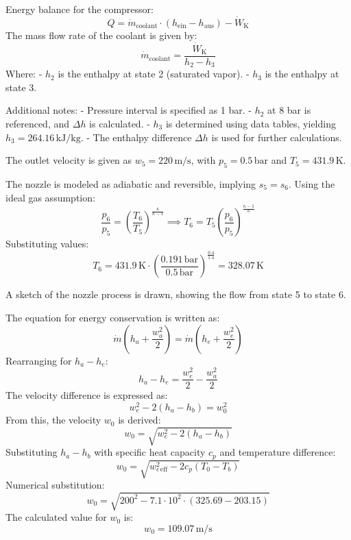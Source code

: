 Energy balance for the compressor:  
\[
Q = \dot{m}_{\text{coolant}} \cdot (h_{\text{ein}} - h_{\text{aus}}) - \dot{W}_{\text{K}}
\]  
The mass flow rate of the coolant is given by:  
\[
\dot{m}_{\text{coolant}} = \frac{\dot{W}_{\text{K}}}{h_2 - h_3}
\]  
Where:  
- \( h_2 \) is the enthalpy at state 2 (saturated vapor).  
- \( h_3 \) is the enthalpy at state 3.  

Additional notes:  
- Pressure interval is specified as 1 bar.  
- \( h_2 \) at 8 bar is referenced, and \( \Delta h \) is calculated.  
- \( h_3 \) is determined using data tables, yielding \( h_3 = 264.16 \, \text{kJ/kg} \).  
- The enthalpy difference \( \Delta h \) is used for further calculations.

The outlet velocity is given as \( w_5 = 220 \, \text{m/s} \), with \( p_5 = 0.5 \, \text{bar} \) and \( T_5 = 431.9 \, \text{K} \).  

The nozzle is modeled as adiabatic and reversible, implying \( s_5 = s_6 \). Using the ideal gas assumption:  
\[
\frac{p_6}{p_5} = \left( \frac{T_6}{T_5} \right)^{\frac{\kappa}{\kappa - 1}} \implies T_6 = T_5 \left( \frac{p_6}{p_5} \right)^{\frac{\kappa - 1}{\kappa}}
\]  
Substituting values:  
\[
T_6 = 431.9 \, \text{K} \cdot \left( \frac{0.191 \, \text{bar}}{0.5 \, \text{bar}} \right)^{\frac{0.4}{1.4}} = 328.07 \, \text{K}
\]  

A sketch of the nozzle process is drawn, showing the flow from state 5 to state 6.

The equation for energy conservation is written as:  
\[
\dot{m} \left( h_a + \frac{w_a^2}{2} \right) = \dot{m} \left( h_e + \frac{w_e^2}{2} \right)
\]  
Rearranging for \( h_a - h_e \):  
\[
h_a - h_e = \frac{w_e^2}{2} - \frac{w_a^2}{2}
\]  
The velocity difference is expressed as:  
\[
w_e^2 - 2(h_a - h_b) = w_0^2
\]  
From this, the velocity \( w_0 \) is derived:  
\[
w_0 = \sqrt{w_e^2 - 2(h_a - h_b)}
\]  
Substituting \( h_a - h_b \) with specific heat capacity \( c_p \) and temperature difference:  
\[
w_0 = \sqrt{w_e^2_{\text{eff}} - 2 c_p (T_0 - T_b)}
\]  
Numerical substitution:  
\[
w_0 = \sqrt{200^2 - 7.1 \cdot 10^2 \cdot (325.69 - 203.15)}
\]  
The calculated value for \( w_0 \) is:  
\[
w_0 = 109.07 \, \text{m/s}
\]